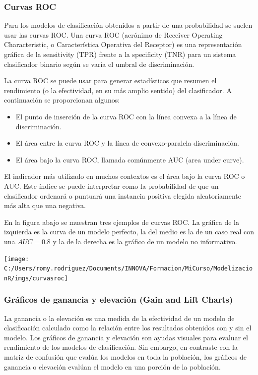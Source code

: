 \documentclass[]{book}
\providecommand{\tightlist}{%
  \setlength{\itemsep}{0pt}\setlength{\parskip}{0pt}}
\begin{document}
\hypertarget{curvas-roc}{%
\subsubsection{Curvas ROC}\label{curvas-roc}}

Para los modelos de clasificación obtenidos a partir de una probabilidad se suelen usar las curvas ROC. Una curva ROC (acrónimo de Receiver Operating Characteristic, o Característica Operativa del Receptor) es una representación gráfica de la sensitivity (TPR) frente a la specificity (TNR) para un sistema clasificador binario según se varía el umbral de discriminación.

La curva ROC se puede usar para generar estadísticos que resumen el rendimiento (o la efectividad, en su más amplio sentido) del clasificador. A continuación se proporcionan algunos:

\begin{itemize}
\tightlist
\item
  El punto de inserción de la curva ROC con la línea convexa a la línea de discriminación.
\item
  El área entre la curva ROC y la línea de convexo-paralela discriminación.
\item
  El área bajo la curva ROC, llamada comúnmente AUC (area under curve).
\end{itemize}

El indicador más utilizado en muchos contextos es el área bajo la curva ROC o AUC. Este índice se puede interpretar como la probabilidad de que un clasificador ordenará o puntuará una instancia positiva elegida aleatoriamente más alta que una negativa.

En la figura abajo se muestran tres ejemplos de curvas ROC. La gráfica de la izquierda es la curva de un modelo perfecto, la del medio es la de un caso real con una \(AUC = 0.8\) y la de la derecha es la gráfico de un modelo no informativo.

\texttt{[image: C:/Users/romy.rodriguez/Documents/INNOVA/Formacion/MiCurso/ModelizacionR/imgs/curvasroc]}

\hypertarget{graficos-de-ganancia-y-elevacion-gain-and-lift-charts}{%
\subsubsection{Gráficos de ganancia y elevación (Gain and Lift Charts)}\label{graficos-de-ganancia-y-elevacion-gain-and-lift-charts}}

La ganancia o la elevación es una medida de la efectividad de un modelo de clasificación calculado como la relación entre los resultados obtenidos con y sin el modelo. Los gráficos de ganancia y elevación son ayudas visuales para evaluar el rendimiento de los modelos de clasificación. Sin embargo, en contraste con la matriz de confusión que evalúa los modelos en toda la población, los gráficos de ganancia o elevación evalúan el modelo en una porción de la población.
\end{document}
